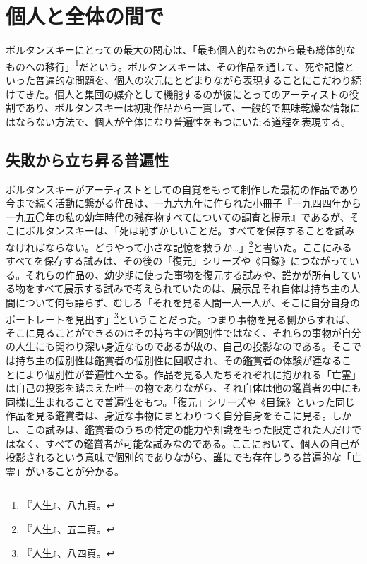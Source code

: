\documentclass[b5j,twoside,twocolumn]{utarticle}
\newcommand{\mysection}[1]{\vspace{-5mm}\section{#1}\vspace{-2mm}}
\newcommand{\mysubsection}[1]{\vspace{-6mm}\subsection{#1}\vspace{-2mm}}
\begin{document}
\mysection{個人と全体の間で}
ボルタンスキーにとっての最大の関心は、「最も個人的なものから最も総体的なものへの移行」\footnote{『人生』、八九頁。}だという。ボルタンスキーは、その作品を通して、死や記憶といった普遍的な問題を、個人の次元にとどまりながら表現することにこだわり続けてきた。個人と集団の媒介として機能するのが彼にとってのアーティストの役割であり、ボルタンスキーは初期作品から一貫して、一般的で無味乾燥な情報にはならない方法で、個人が全体になり普遍性をもつにいたる道程を表現する。
\mysubsection{失敗から立ち昇る普遍性}
ボルタンスキーがアーティストとしての自覚をもって制作した最初の作品であり今まで続く活動に繋がる作品は、一九六九年に作られた小冊子『一九四四年から一九五〇年の私の幼年時代の残存物すべてについての調査と提示』であるが、そこにボルタンスキーは、「死は恥ずかしいことだ。すべてを保存することを試みなければならない。どうやって小さな記憶を救うか…」\footnote{『人生』、五二頁。}と書いた。ここにみるすべてを保存する試みは、その後の「復元」シリーズや《目録》につながっている。それらの作品の、幼少期に使った事物を復元する試みや、誰かが所有している物をすべて展示する試みで考えられていたのは、展示品それ自体は持ち主の人間について何も語らず、むしろ「それを見る人間一人一人が、そこに自分自身のポートレートを見出す」\footnote{『人生』、八四頁。}ということだった。つまり事物を見る側からすれば、そこに見ることができるのはその持ち主の個別性ではなく、それらの事物が自分の人生にも関わり深い身近なものであるが故の、自己の投影なのである。そこでは持ち主の個別性は鑑賞者の個別性に回収され、その鑑賞者の体験が連なることにより個別性が普遍性へ至る。作品を見る人たちそれぞれに抱かれる「亡霊」は自己の投影を踏まえた唯一の物でありながら、それ自体は他の鑑賞者の中にも同様に生まれることで普遍性をもつ。「復元」シリーズや《目録》といった同じ作品を見る鑑賞者は、身近な事物にまとわりつく自分自身をそこに見る。しかし、この試みは、鑑賞者のうちの特定の能力や知識をもった限定された人だけではなく、すべての鑑賞者が可能な試みなのである。ここにおいて、個人の自己が投影されるという意味で個別的でありながら、誰にでも存在しうる普遍的な「亡霊」がいることが分かる。
\end{document}
